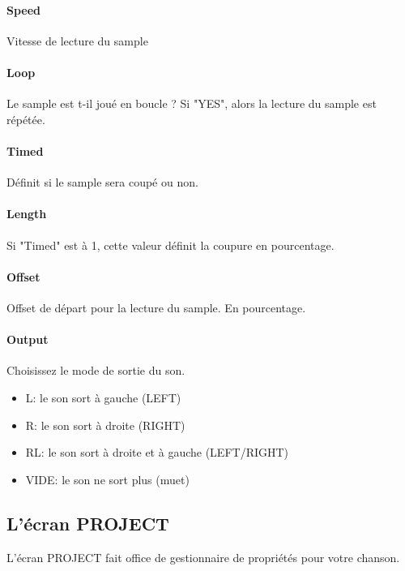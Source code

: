 \documentclass[12pt,a4paper]{article}
\begin{document}
        \paragraph{Speed} Vitesse de lecture du sample

        \paragraph{Loop} Le sample est t-il joué en boucle ? Si "YES", alors la lecture du sample est répétée.

        \paragraph{Timed} Définit si le sample sera coupé ou non.

        \paragraph{Length} Si "Timed" est à 1, cette valeur définit la coupure en pourcentage.

        \paragraph{Offset} Offset de départ pour la lecture du sample. En pourcentage.

        \paragraph{Output} Choisissez le mode de sortie du son.
        \begin{itemize}
            \item{L: le son sort à gauche (LEFT)}
            \item{R: le son sort à droite (RIGHT)}
            \item{RL: le son sort à droite et à gauche (LEFT/RIGHT)}
            \item{VIDE: le son ne sort plus (muet)}
        \end{itemize}
    
    \subsection{L'écran PROJECT}
    
    L'écran PROJECT fait office de gestionnaire de propriétés pour votre chanson. 
    
\end{document}
